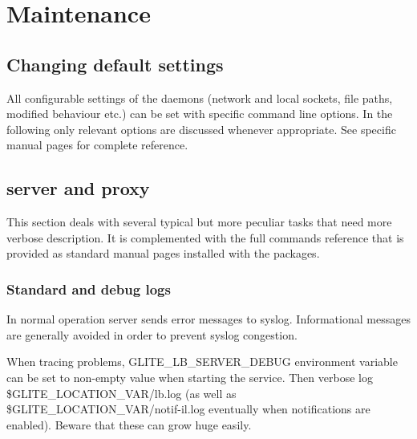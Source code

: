 %
%
\section{Maintenance}

\subsection{Changing default settings}
All configurable settings of the \LB daemons (network and local sockets, 
file paths, modified behaviour etc.) can be set with specific command line
options.
In the following only relevant options are discussed whenever appropriate.
See specific manual pages for complete reference.

\subsection{\LB server and proxy}

This section deals with several typical but more peculiar tasks
that need more verbose description.
It is complemented with the full commands reference that is provided
as standard manual pages installed with the \LB packages.

\subsubsection{Standard and debug logs}

In normal operation \LB server sends error messages to syslog.
Informational messages are generally avoided in order to prevent syslog congestion.

\begin{sloppypar}
When tracing problems, GLITE\_LB\_SERVER\_DEBUG environment variable can be set to
non-empty value when starting the service.
Then verbose log \$GLITE\_LOCATION\_VAR/lb.log 
(as well as \$GLITE\_LOCATION\_VAR/notif-il.log eventually when notifications are enabled).
Beware that these can grow huge easily.
\end{sloppypar}

